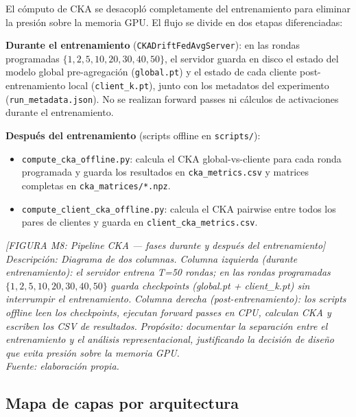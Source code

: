 El cómputo de CKA se desacopló completamente del entrenamiento para eliminar la presión sobre
la memoria GPU. El flujo se divide en dos etapas diferenciadas:

\textbf{Durante el entrenamiento} (\texttt{CKADriftFedAvgServer}): en las rondas programadas
$\{1, 2, 5, 10, 20, 30, 40, 50\}$, el servidor guarda en disco el estado del modelo global
pre-agregación (\texttt{global.pt}) y el estado de cada cliente post-entrenamiento local
(\texttt{client\_k.pt}), junto con los metadatos del experimento (\texttt{run\_metadata.json}).
No se realizan forward passes ni cálculos de activaciones durante el entrenamiento.

\textbf{Después del entrenamiento} (scripts offline en \texttt{scripts/}):
\begin{itemize}
  \item \texttt{compute\_cka\_offline.py}: calcula el CKA global-vs-cliente para cada ronda
    programada y guarda los resultados en \texttt{cka\_metrics.csv} y matrices completas en
    \texttt{cka\_matrices/*.npz}.
  \item \texttt{compute\_client\_cka\_offline.py}: calcula el CKA pairwise entre todos los
    pares de clientes y guarda en \texttt{client\_cka\_metrics.csv}.
\end{itemize}

\begin{center}
\textit{[FIGURA M8: Pipeline CKA — fases durante y después del entrenamiento]}\\
\textit{Descripción: Diagrama de dos columnas. Columna izquierda (durante entrenamiento):}
\textit{el servidor entrena T=50 rondas; en las rondas programadas $\{1,2,5,10,20,30,40,50\}$}
\textit{guarda checkpoints (global.pt + client\_k.pt) sin interrumpir el entrenamiento.}
\textit{Columna derecha (post-entrenamiento): los scripts offline leen los checkpoints,}
\textit{ejecutan forward passes en CPU, calculan CKA y escriben los CSV de resultados.}
\textit{Propósito: documentar la separación entre el entrenamiento y el análisis representacional,}
\textit{justificando la decisión de diseño que evita presión sobre la memoria GPU.}\\
\textit{Fuente: elaboración propia.}
\end{center}

\subsection{Mapa de capas por arquitectura}

